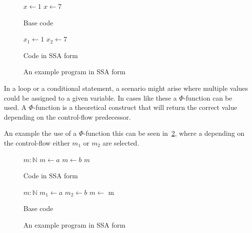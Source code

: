 \begin{figure}[h]
    \begin{minipage}[t]{0.5\textwidth}
        \centering
        \begin{algorithmic}
            \State $x \gets 1$
            \State {}
            \State $x \gets 7$
            \State {}
        \end{algorithmic}
        Base code
    \end{minipage}
    \begin{minipage}[t]{0.5\textwidth}
        \centering
        \begin{algorithmic}
            \State $x_1 \gets 1$
            \State {}
            \State $x_2 \gets 7$
            \State {}
        \end{algorithmic}
        Code in SSA form
    \end{minipage}
    \caption{An example program in SSA form}
    \label{fig:basics:SSA-simple}
\end{figure}

In a loop or a conditional statement, a scenario might arise where multiple values could be assigned to a given variable.
In cases like these a $\Phi$-function can be used.
A $\Phi$-function is a theoretical construct that will return the correct value depending on the control-flow predecessor.

An example the use of a $\Phi$-function this can be seen in~\cref{fig:basics:SSA-phi}, where a depending on the control-flow either $m_1$ or $m_2$ are selected.

\begin{figure}[h]
    \begin{minipage}[t]{0.5\textwidth}
        \centering
        \begin{algorithmic}
                \State $m: \mathbb{N}$
                    \State $m \gets a$
                \Else
                    \State $m \gets b$
                \EndIf
                \State \Return $m$
            \EndFunction
        \end{algorithmic}
        Code in SSA form
    \end{minipage}
    \begin{minipage}[t]{0.5\textwidth}
        \centering
        \begin{algorithmic}
                \State $m: \mathbb{N}$
                    \State $m_1 \gets a$
                \Else
                    \State $m_2 \gets b$
                \EndIf
                \State $m \gets$ 
                \State \Return m
            \EndFunction
        \end{algorithmic}
        Base code
    \end{minipage}
    \caption{An example program in SSA form}
    \label{fig:basics:SSA-phi}
\end{figure}

